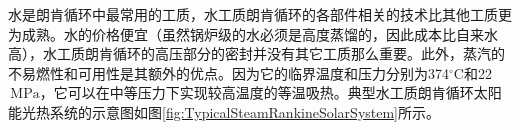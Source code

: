 水是朗肯循环中最常用的工质，水工质朗肯循环的各部件相关的技术比其他工质更为成熟。水的价格便宜（虽然锅炉级的水必须是高度蒸馏的，因此成本比自来水高），水工质朗肯循环的高压部分的密封并没有其它工质那么重要。此外，蒸汽的不易燃性和可用性是其额外的优点。因为它的临界温度和压力分别为374$\mathrm{^\circ C}$和22$\,\mathrm{MPa}$，它可以在中等压力下实现较高温度的等温吸热。典型水工质朗肯循环太阳能光热系统的示意图如图\ref{fig:TypicalSteamRankineSolarSystem}所示。


